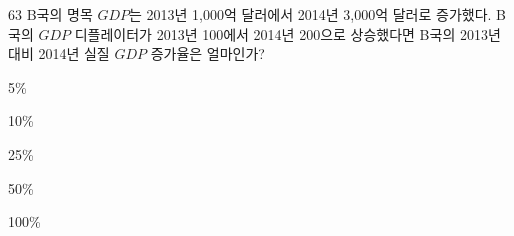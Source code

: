 \begin{question}{63}
B국의 명목 $GDP$는 2013년 1,000억 달러에서 2014년 3,000억 달러로 증가했다. B국의 $GDP$ 디플레이터가 2013년 100에서 2014년 200으로 상승했다면 B국의 2013년 대비 2014년 실질 $GDP$ 증가율은 얼마인가?
\begin{choices}
  \item 5\%
  \item 10\%
  \item 25\%
  \item 50\%
  \item 100\%
\end{choices}
\end{question}
